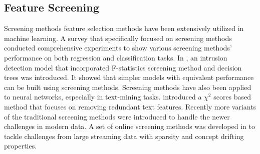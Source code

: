 
\subsection{Feature Screening} %
Screening methods feature selection methods have been extensively utilized in machine learning. A survey\cite{wang2019screening} that specifically focused on screening methods conducted comprehensive experiments to show various screening methods' performance on both regression and classification tasks. 
In \cite{shakeela2021optimal}, an intrusion detection model that incorporated F-statistics screening method and decision trees was introduced. It showed that simpler models with equivalent performance can be built using screening methods. 
Screening methods have also been applied to neural networks, especially in text-mining tasks. \cite{wang2021feature} introduced a $\chi^2$ scores based method that focuses on removing redundant text features. 
Recently more variants of the traditional screening methods were introduced to handle the newer challenges in modern data. A set of online screening methods was developed in \cite{wang2022online} to tackle challenges from large streaming data with sparsity and concept drifting properties. 

